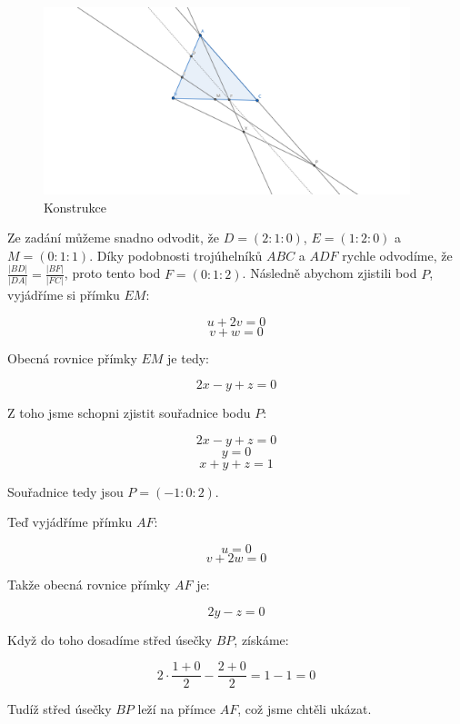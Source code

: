 \documentclass{fkssolpub}
\author{Ondřej Sedláček}
\begin{document}
 

\begin{figure}
  \begin{center}
    \includegraphics[width=0.95\textwidth]{1-fig.png}
  \end{center}
  \caption{Konstrukce}
  \label{fig:1}
\end{figure}


Ze zadání můžeme snadno odvodit, že $D = (2 : 1 : 0)$, $E = (1 : 2 : 0)$
a $M = (0 : 1 : 1)$. Díky podobnosti trojúhelníků $ABC$ a $ADF$ rychle
odvodíme, že $\frac{|BD|}{|DA|} = \frac{|BF|}{|FC|}$, proto tento bod
$F = (0 : 1 : 2)$. Následně abychom zjistili bod $P$, vyjádříme si
přímku $EM$:

\[
  u + 2v = 0
\]
\[
  v + w = 0
\]

Obecná rovnice přímky $EM$ je tedy:

\[
  2x - y + z = 0
\]

Z toho jsme schopni zjistit souřadnice bodu $P$:

\[
  2x - y + z = 0
\]
\[
  y = 0
\]
\[
  x + y + z = 1
\]

Souřadnice tedy jsou $P = (-1 : 0: 2)$.

Teď vyjádříme přímku $AF$:

\[
  u = 0
\]
\[
  v + 2w = 0
\]

Takže obecná rovnice přímky $AF$ je:

\[
  2y - z = 0
\]

Když do toho dosadíme střed úsečky $BP$, získáme:

\[
  2 \cdot \frac{1 + 0}{2} - \frac{2 + 0}{2} = 1 - 1 = 0
\]

Tudíž střed úsečky $BP$ leží na přímce $AF$, což jsme chtěli ukázat.
\end{document}
